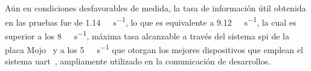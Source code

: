 Aún en condiciones desfavorables de medida, la tasa de información útil obtenida en las pruebas fue de \SI{1,14}{\mega\byte\per\second}, lo que es equivalente a \SI{9,12}{\mega\bit\per\second}, la cual es superior a los \SI{8}{\mega\bit\per\second}, máxima tasa alcanzable a través del sistema \acrshort{spi} de la placa Mojo~\cite{Atmel2016} y a los \SI{5}{\mega\bit\per\second} que otorgan los mejores dispositivos que emplean el sistema \acrshort{uart}~\cite{TexasInstrument2013}, ampliamente utilizado en la comunicación de desarrollos.
%
%
%
%
%
%
